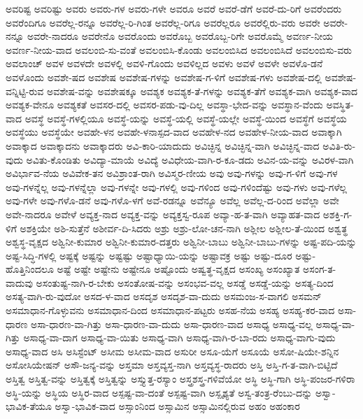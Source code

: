 {ಅವರಿಷ್ಟ
ಅವರಿಷ್ಟು
ಅವರು
ಅವರು-ಗಳ
ಅವರು-ಗಳೇ
ಅವರೂ
ಅವರೆ
ಅವರೆ-ಡೆಗೆ
ಅವರೆ-ದು-ರಿಗೆ
ಅವರೆಂದರು
ಅವರೆಂದಿಗೂ
ಅವರೆಲ್ಲ-ರನ್ನೂ
ಅವರೆಲ್ಲ-ರಿ-ಗಿಂತ
ಅವರೆಲ್ಲ-ರಿಗೂ
ಅವರೆಲ್ಲರೂ
ಅವರೆಲ್ಲಿರು-ವರು
ಅವರೇ
ಅವರೇ-ನನ್ನೂ
ಅವರೇ-ನಾದರೂ
ಅವರೇನೊ
ಅವರೊಂದು
ಅವರೊಬ್ಬ
ಅವರೊಬ್ಬ-ರಿಗೇ
ಅವರೊಮ್ಮೆ
ಅವರ್ಣ-ನೀಯ
ಅವರ್ಣ-ನೀಯ-ವಾದ
ಅವಲಂಬಿ-ಸು-ವಂತೆ
ಅವಲಂಬಿಸಿ-ಕೊಂಡು
ಅವಲಂಬಿಸಿದ
ಅವಲಂಬಿಸಿದೆ
ಅವಲಂಬಿಸು-ವರು
ಅವಲಾಂಚ್
ಅವಳ
ಅವಳದೇ
ಅವಳಲ್ಲಿ
ಅವಳಿ-ಗೊಂದು
ಅವಳಿಲ್ಲದ
ಅವಳು
ಅವಳೆ
ಅವಳೇ
ಅವಳೊ-ಡನೆ
ಅವಳೊಂದು
ಅವಶೇ-ಷದ
ಅವಶೇಷ
ಅವಶೇಷ-ಗಳನ್ನು
ಅವಶೇಷ-ಗ-ಳಿಗೆ
ಅವಶೇಷ-ಗಳು
ಅವಶೇಷ-ದಲ್ಲಿ
ಅವಶೇಷ-ವನ್ನಿಟ್ಟಿ-ರುವ
ಅವಶೇಷ-ವನ್ನು
ಅವಶೇಷಕ್ಕೂ
ಅವಶ್ಯಕ
ಅವಶ್ಯಕ-ತೆ-ಗಳನ್ನು
ಅವಶ್ಯಕ-ತೆಗೆ
ಅವಶ್ಯಕ-ವಾಗಿ
ಅವಶ್ಯಕ-ವಾದ
ಅವಶ್ಯಕ-ವೇನೂ
ಅವಶ್ಯಕತೆ
ಅವಸರ-ದಲ್ಲಿ
ಅವಸರ-ಪಡು-ವು-ದಿಲ್ಲ
ಅವಸ್ಥಾ-ಭೇದ-ವನ್ನು
ಅವಸ್ಥಾನ-ವೆಂದು
ಅವಸ್ಥಿತ-ವಾದ
ಅವಸ್ಥೆ
ಅವಸ್ಥೆ-ಗಳಲ್ಲಿಯೂ
ಅವಸ್ಥೆ-ಯನ್ನು
ಅವಸ್ಥೆ-ಯಲ್ಲಿ
ಅವಸ್ಥೆ-ಯಲ್ಲೇ
ಅವಸ್ಥೆ-ಯಿಂದ
ಅವಸ್ಥೆಗೆ
ಅವಸ್ಥೆಯ
ಅವಸ್ಥೆಯು
ಅವಸ್ಥೆಯೇ
ಅವಹೇ-ಳನ
ಅವಹೇ-ಳನಾಸ್ಪದ-ವಾದ
ಅವಹೇಳ-ನದ
ಅವಹೇಳ-ನೀಯ-ವಾದ
ಅವಾಕ್ಕಾಗಿ
ಅವಾಕ್ಕಾದ
ಅವಾಕ್ಕಾದನು
ಅವಾಕ್ಕಾದರು
ಅವಿ-ಕಾರಿ-ಯಾದುದು
ಅವಿಚ್ಛಿನ್ನ
ಅವಿಚ್ಛಿನ್ನ-ವಾಗಿ
ಅವಿಚ್ಛಿನ್ನ-ವಾದ
ಅವಿತಿ-ರು-ವುದು
ಅವಿತು-ಕೊಂಡಿತು
ಅವಿದ್ಯಾ-ಮಾಯೆ
ಅವಿದ್ಯೆ
ಅವಿಧೇಯ-ವಾಗಿ-ರ-ಕೂ-ಡದು
ಅವಿನ-ಯ-ವನ್ನು
ಅವಿರಳ-ವಾಗಿ
ಅವಿರ್ಭಾವ-ನೆಯ
ಅವಿವೇಕ-ತನ
ಅವಿಶ್ರಾಂತ-ರಾಗಿ
ಅವಿಸ್ಮರ-ಣೀಯ
ಅವು
ಅವು-ಗಳನ್ನು
ಅವು-ಗ-ಳಿಗೆ
ಅವು-ಗಳ
ಅವು-ಗಳನ್ನೆಲ್ಲ
ಅವು-ಗಳನ್ನೆಲ್ಲಾ
ಅವು-ಗಳನ್ನೇ
ಅವು-ಗಳಲ್ಲಿ
ಅವು-ಗಳಿಂದ
ಅವು-ಗಳಿಂದೆಷ್ಟು
ಅವು-ಗಳು
ಅವು-ಗಳೆಲ್ಲ
ಅವು-ಗಳೇ
ಅವು-ಗಳೊ-ಡನೆ
ಅವು-ಗಳೊ-ಳಗೆ
ಅವೆ-ರಡನ್ನೂ
ಅವೆನ್ಯೂ
ಅವೆಲ್ಲ
ಅವೆಲ್ಲ-ದ-ರಿಂದ
ಅವೆಲ್ಲಾ
ಅವೇ
ಅವೇ-ನಾದರೂ
ಅವೇಳೆ
ಅವ್ಯಕ್ತ-ನಾದ
ಅವ್ಯಕ್ತ-ವನ್ನು
ಅವ್ಯಕ್ತಸ್ವ-ರೂಪ
ಅವ್ಯಾ-ಹ-ತ-ವಾಗಿ
ಅವ್ಯಾಹತ-ವಾದ
ಅಶಕ್ತಿ-ಗ-ಳಿಗೆ
ಅಶಕ್ತಿಯೇ
ಅಶಿ-ಸುತ್ತೆನೆ
ಅಶೀರ್ವ-ದಿ-ಸಿದರು
ಅಶ್ರು
ಅಶ್ರು-ಲೋ-ಚನ-ನಾಗಿ
ಅಶ್ಲೀಲ
ಅಶ್ಲೀಲ-ತೆ-ಯಿಂದ
ಅಶ್ವತ್ಥ
ಅಶ್ವಸ್ಥ-ವೃಕ್ಷದ
ಅಶ್ವಿನೀ-ಕುಮಾರ
ಅಶ್ವಿನೀ-ಕುಮಾರ-ದತ್ತರು
ಅಶ್ವಿನೀ-ಬಾಬು
ಅಶ್ವಿನೀ-ಬಾಬು-ಗಳನ್ನು
ಅಷ್ಟ-ಪದಿ-ಯನ್ನು
ಅಷ್ಟ-ಸಿದ್ಧಿ-ಗಳಲ್ಲಿ
ಅಷ್ಟಕ್ಕೆ
ಅಷ್ಟನ್ನು
ಅಷ್ಟಷ್ಟು
ಅಷ್ಟಾಧ್ಯಾಯಿ-ಯನ್ನು
ಅಷ್ಟಾವಕ್ರ
ಅಷ್ಟು
ಅಷ್ಟು-ದೂರ
ಅಷ್ಟು-ಹೊತ್ತಿನಿಂದಲೂ
ಅಷ್ಟೆ
ಅಷ್ಟೇ
ಅಷ್ಟೇನು
ಅಷ್ಟೇನೂ
ಅಷ್ಟೊಂದು
ಅಷ್ವತ್ಥ-ವೃಕ್ಷದ
ಅಸಂಖ್ಯ
ಅಸಂಖ್ಯಾತ
ಅಸಂಗ-ತ-ವಾದುವು
ಅಸಂತುಷ್ಟ-ನಾಗಿ-ರ-ಬೇಕು
ಅಸಂತೋಷ-ವನ್ನು
ಅಸಂಭವ-ವಲ್ಲ
ಅಸಡ್ಡೆ
ಅಸಡ್ಡೆ-ಯನ್ನು
ಅಸತ್ಯ-ದಿಂದ
ಅಸತ್ಯ-ವಾಗಿ-ರು-ವುದೋ
ಅಸದ-ಳ-ವಾದ
ಅಸದೃಶ
ಅಸದೃಶ-ವಾ-ದುದು
ಅಸಮಂಜ-ಸ-ವಾಗಲಿ
ಅಸಮನ್
ಅಸಮಾಧಾನ-ಗೊಳ್ಳುವನು
ಅಸಮಾಧಾನ-ದಿಂದ
ಅಸಮಾಧಾನ-ಪಟ್ಟರು
ಅಸಹ-ನೆಯ
ಅಸಹ್ಯ
ಅಸಹ್ಯ-ಕರ-ವಾದ
ಅಸಾ-ಧಾರಣ
ಅಸಾ-ಧಾರಣ-ವಾ-ಗಿತ್ತು
ಅಸಾ-ಧಾರಣ-ವಾ-ದುದು
ಅಸಾ-ಧಾರಣ-ವಾದ
ಅಸಾಧ್ಯ
ಅಸಾಧ್ಯ-ವಲ್ಲ
ಅಸಾಧ್ಯ-ವಾ-ಗಿತ್ತು
ಅಸಾಧ್ಯ-ವಾ-ದಾಗ
ಅಸಾಧ್ಯ-ವಾ-ಯಿತು
ಅಸಾಧ್ಯ-ವಾಗಿ
ಅಸಾಧ್ಯ-ವಾಗಿ-ರ-ಬಾ-ರದು
ಅಸಾಧ್ಯ-ವಾಗು-ವುದು
ಅಸಾಧ್ಯ-ವಾದ
ಅಸಿ
ಅಸಿಸ್ಟೆಂಟ್
ಅಸೀಮ
ಅಸೀಮ-ವಾದ
ಅಸುರೀ
ಅಸೂ-ಯೆಗೆ
ಅಸೂಯೆ
ಅಸೋ-ಷಿಯೇ-ಶನ್ನಿನ
ಅಸೋಸಿಯೇಷನ್
ಅಸೌ-ಜನ್ಯ-ವನ್ನು
ಅಸ್ತಮಾ
ಅಸ್ತವ್ಯಸ್ತ-ನಾಗಿ
ಅಸ್ತವ್ಯಸ್ಥ-ರಾದರು
ಅಸ್ತಿ
ಅಸ್ತಿ-ಗ-ತ-ವಾಗಿ-ಬಿಟ್ಟಿದೆ
ಅಸ್ತಿತ್ವ
ಅಸ್ತಿತ್ವ-ವನ್ನು
ಅಸ್ತಿತ್ವಕ್ಕೆ
ಅಸ್ತಿತ್ವನ್ನು
ಅಸ್ತ್ಯುತ್ತ-ರಸ್ಯಾಂ
ಅಸ್ತ್ರಶಸ್ತ್ರ-ಗಳಿವೆಯೋ
ಅಸ್ಥಿ
ಅಸ್ಥಿ-ಗಾಗಿ
ಅಸ್ಥಿ-ಪಂಜರ-ಗಳಿರಾ
ಅಸ್ಥಿ-ಯನ್ನು
ಅಸ್ಥಿಯ
ಅಸ್ಥಿರ-ವಾದ
ಅಸ್ಪಷ್ಟ-ವಾ-ದಂತೆ
ಅಸ್ಪಷ್ಟ-ವಾಗಿ
ಅಸ್ಪೃಶ್ಯತೆ
ಅಸ್ವ-ತಂತ್ರ-ರೆಂಬು-ದನ್ನು
ಅಸ್ವಾ-ಭಾವಿಕ-ತೆಯೂ
ಅಸ್ವಾ-ಭಾವಿಕ-ವಾದ
ಅಸ್ಸಾಂನಿಂದ
ಅಸ್ಸಾಮಿನ
ಅಸ್ಸಾಮಿನಲ್ಲಿರುವ
ಅಹಂ
ಅಹಂಕಾರ
}
